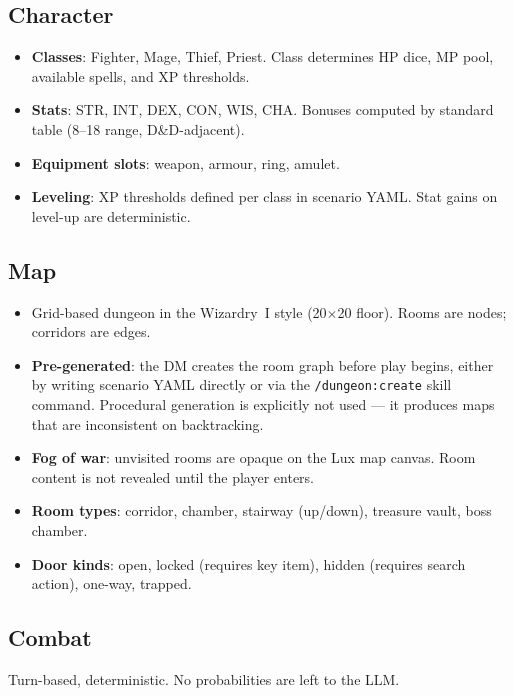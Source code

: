 \documentclass[a4paper,10pt]{article}
\newcommand{\cmd}[1]{\texttt{#1}}
\begin{document}
\subsection{Character}

\begin{itemize}
  \item \textbf{Classes}: Fighter, Mage, Thief, Priest.
    Class determines HP dice, MP pool, available spells, and XP
    thresholds.
  \item \textbf{Stats}: STR, INT, DEX, CON, WIS, CHA.
    Bonuses computed by standard table (8--18 range, D\&D-adjacent).
  \item \textbf{Equipment slots}: weapon, armour, ring, amulet.
  \item \textbf{Leveling}: XP thresholds defined per class in
    scenario YAML.  Stat gains on level-up are deterministic.
\end{itemize}

\subsection{Map}

\begin{itemize}
  \item Grid-based dungeon in the Wizardry~I style (20$\times$20
    floor).  Rooms are nodes; corridors are edges.
  \item \textbf{Pre-generated}: the DM creates the room graph before
    play begins, either by writing scenario YAML directly or via the
    \cmd{/dungeon:create} skill command.  Procedural generation is
    explicitly not used --- it produces maps that are inconsistent on
    backtracking.
  \item \textbf{Fog of war}: unvisited rooms are opaque on the Lux
    map canvas.  Room content is not revealed until the player enters.
  \item \textbf{Room types}: corridor, chamber, stairway (up/down),
    treasure vault, boss chamber.
  \item \textbf{Door kinds}: open, locked (requires key item),
    hidden (requires search action), one-way, trapped.
\end{itemize}

\subsection{Combat}

Turn-based, deterministic.  No probabilities are left to the LLM.
\end{document}
